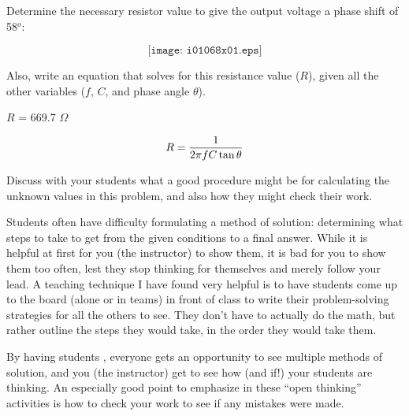 

Determine the necessary resistor value to give the output voltage a phase shift of 58$^{o}$:

$$\texttt{[image: i01068x01.eps]}$$

Also, write an equation that solves for this resistance value ($R$), given all the other variables ($f$, $C$, and phase angle $\theta$).







$R$ = 669.7 $\Omega$

\vskip 10pt

$$R = {1 \over {2 \pi f C \tan \theta}}$$







Discuss with your students what a good procedure might be for calculating the unknown values in this problem, and also how they might check their work.

\vskip 10pt

Students often have difficulty formulating a method of solution: determining what steps to take to get from the given conditions to a final answer.  While it is helpful at first for you (the instructor) to show them, it is bad for you to show them too often, lest they stop thinking for themselves and merely follow your lead.  A teaching technique I have found very helpful is to have students come up to the board (alone or in teams) in front of class to write their problem-solving strategies for all the others to see.  They don't have to actually do the math, but rather outline the steps they would take, in the order they would take them.

By having students , everyone gets an opportunity to see multiple methods of solution, and you (the instructor) get to see how (and if!) your students are thinking.  An especially good point to emphasize in these ``open thinking'' activities is how to check your work to see if any mistakes were made.




